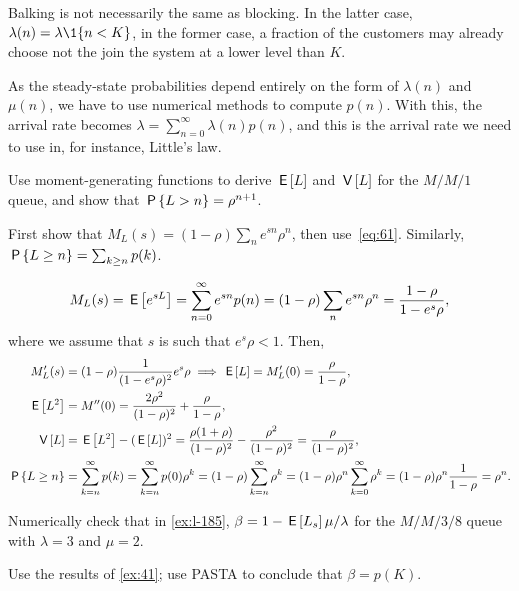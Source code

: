  Balking is not necessarily the same as blocking.
 In the latter case, $\lambda(n)= \lambda \1{n < K}$, in the former case, a fraction of the customers may already choose not the join the system at a lower level than $K$.

 As the steady-state probabilities depend entirely on the form of $\lambda(n)$ and $\mu(n)$, we have to use numerical methods to compute $p(n)$.
 With this, the arrival rate becomes $\lambda = \sum_{n=0}^\infty \lambda(n) p(n)$, and this is the arrival rate we need to use in, for instance, Little's law.



\begin{exercise}\label{ex:34}
Use moment-generating functions to derive $\E\L$ and $\V\L$ for the $M/M/1$ queue, and show that $\P{L>n} = \rho^{n+1}$.
\begin{hint} 
First show that $M_L(s) = (1-\rho) \sum_n e^{s n} \rho^n$, then use~\cref{eq:61}.
Similarly, $\P{\L\geq n} = \sum_{k\geq n} p(k)$.
\end{hint}
\begin{solution}
\begin{equation*}
 M_L(s) = \E{e^{s L}} = \sum_{n=0}^\infty e^{s n}p(n) = (1-\rho) \sum_n e^{s n} \rho^n=\frac{1-\rho}{1-e^{s}\rho},
\end{equation*}
where we assume that $s$ is such that $e^s \rho < 1$. Then, 
\begin{align*}
 M_L'(s) &= (1-\rho) \frac{1}{(1-e^s\rho)^2} e^s \rho \implies \E\L = M_L'(0)= \frac{\rho}{1-\rho}, \\
 \E{\L^2}&= M''(0)= \frac{2\rho^2}{(1-\rho)^2} + \frac{\rho}{1-\rho},\\
\V\L &= \E{L^2} - (\E\L)^2 = \frac{\rho(1+\rho)}{(1-\rho)^2}-\frac{\rho^2}{(1-\rho)^2} = \frac{\rho}{(1-\rho)^2},\\
 \P{\L\geq n} 
 &= \sum_{k=n}^\infty p(k) = \sum_{k=n}^\infty p(0)\rho^k = (1-\rho)\sum_{k=n}^\infty \rho^k 
= (1-\rho)\rho^n \sum_{k=0}^\infty\rho^k = (1-\rho) \rho^n \frac1{1-\rho} = \rho^n.
\end{align*}
\end{solution}
\end{exercise}

\begin{exercise}
Numerically check that in \cref{ex:l-185}, $\beta=1-\E\Ls \mu /\lambda$ for the $M/M/3/8$ queue with $\lambda=3$ and $\mu=2$. 
\begin{solution}
Use the results of \cref{ex:41}; use PASTA to conclude that $\beta=p(K)$.
\end{solution}
\end{exercise}




